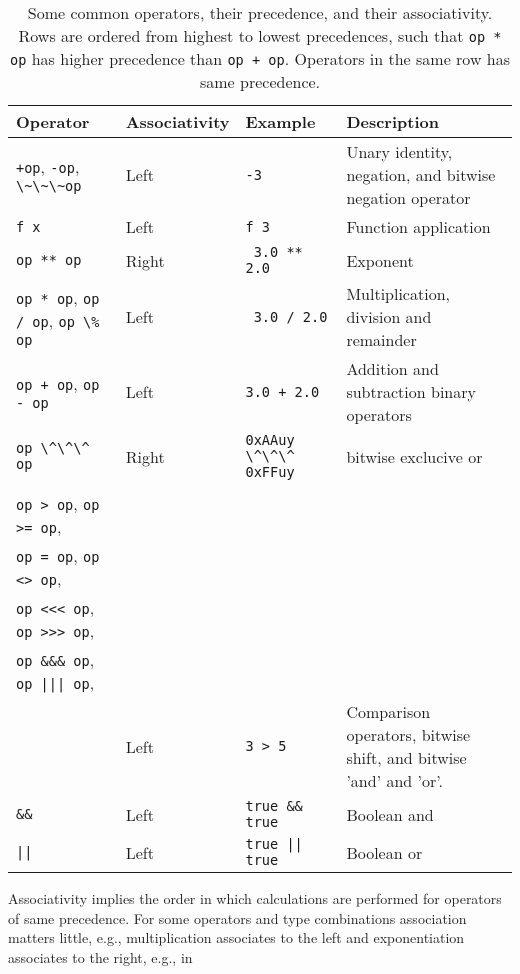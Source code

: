 \begin{table}
  \centering
  \begin{tabularx}{\linewidth}{|l|l|l|X|}
    \hline
    Operator & Associativity & Example & Description\\
    \hline
     \lstinline|+op|, \lstinline|-op|, \lstinline|\~\~\~op| & Left & \lstinline|-3| & Unary identity, negation, and bitwise negation operator\\
     \hline
    \lstinline|f x| & Left & \lstinline|f 3| & Function application\\
    \hline
    \lstinline|op ** op| & Right & \lstinline| 3.0 ** 2.0| & Exponent\\ 
    \hline
    \lstinline|op * op|, \lstinline|op / op|, \lstinline|op \% op| & Left & \lstinline| 3.0 / 2.0| & Multiplication, division and remainder\\
    \hline
    \lstinline|op + op|, \lstinline|op - op| & Left & \lstinline|3.0 + 2.0| & Addition and subtraction binary operators\\
    \hline
     \lstinline|op \^\^\^ op| & Right & \lstinline|0xAAuy \^\^\^ 0xFFuy| & bitwise exclucive or\\
    \hline
    \begin{minipage}[t]{0.25\linewidth}
      \lstinline|op < op|, \lstinline|op <= op|,\\
      \lstinline|op > op|, \lstinline|op >= op|,\\
      \lstinline|op = op|, \lstinline|op <> op|,\\
      \lstinline|op <<< op|, \lstinline|op >>> op|,\\
      {\lstinline|op &&& op|}, \lstinline!op ||| op!,\\
    \end{minipage}
    & Left & \lstinline|3 > 5| & Comparison operators, bitwise shift, and bitwise 'and' and 'or'.\\
    \hline
    {\lstinline|&&|} & Left & {\lstinline|true && true|} & Boolean and\\
    \hline
    \lstinline+||+ & Left & \lstinline+true || true+ & Boolean or\\
    \hline
  \end{tabularx}
  \caption{Some common operators, their precedence, and their associativity. Rows are ordered from highest to lowest precedences, such that \lstinline|op * op| has higher precedence than \lstinline|op + op|. Operators in the same row has same precedence. }
  \label{tab:operatorPrecedence}
\end{table}
Associativity implies the order in which calculations are performed for operators of same precedence. For some operators and type combinations association matters little, e.g., multiplication associates to the left and exponentiation associates to the right, e.g., in
%

